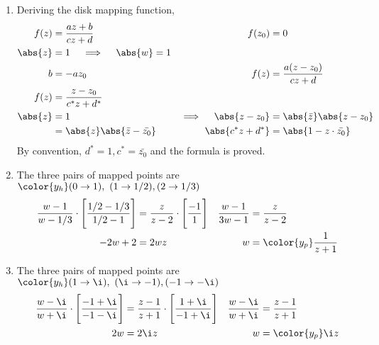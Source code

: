 \begin{enumerate}
    \item Deriving the disk mapping function,
          \begin{align}
              f(z)                         & = \frac{az + b}{cz + d}              &
              f(z_0)                       & = 0                                    \\
              \abs{z}                      & = 1 \quad \implies \quad \abs{w} = 1   \\
              b                            & = -az_0                              &
              f(z)                         & = \frac{a(z - z_0)}{cz + d}            \\
              f(z)                         & = \frac{z - z_0}{c^* z + d^*}          \\
              \abs{z}                      & = 1                                  &
              \implies \quad \abs{z - z_0} & = \abs{\bar{z}} \abs{z - z_0}          \\
                                           & = \abs{z} \abs{\bar{z} - \bar{z_0}}  &
              \abs{c^*z + d^*}             & = \abs{1 - z \cdot \bar{z_0}}
          \end{align}
          By convention, $ d^* = 1, c^* = \bar{z_0} $ and the formula is proved.

    \item The three pairs of mapped points are
          $\color{y_h}  (0 \to 1),\ (1 \to 1/2), (2 \to 1/3) $
          \begin{align}
              \frac{w - 1}{w - 1/3} \cdot \Bigg[\frac{1/2 - 1/3}{1/2 - 1}\Bigg]
                                 & = \frac{z}{z - 2} \cdot \Bigg[ \frac{-1}{1}
              \Bigg]             &
              \frac{w - 1}{3w-1} & = \frac{z}{z-2}                               \\
              - 2w + 2           & =  2wz                                      &
              w                  & = \color{y_p} \frac{1}{z + 1}
          \end{align}

    \item The three pairs of mapped points are
          $\color{y_h}  (1 \to \i),\ (\i \to -1), (-1 \to -\i) $
          \begin{align}
              \frac{w - \i}{w + \i} \cdot \Bigg[\frac{-1 + \i}{-1 - \i}\Bigg]
                                    & = \frac{z - 1}{z + 1} \cdot
              \Bigg[ \frac{1 + \i}{-1 + \i}
              \Bigg]                &
              \frac{w - \i}{w + \i} & = \frac{z - 1}{z + 1}         \\
              2w                    & = 2\i z                     &
              w                     & = \color{y_p} \i z
          \end{align}


\end{enumerate}
